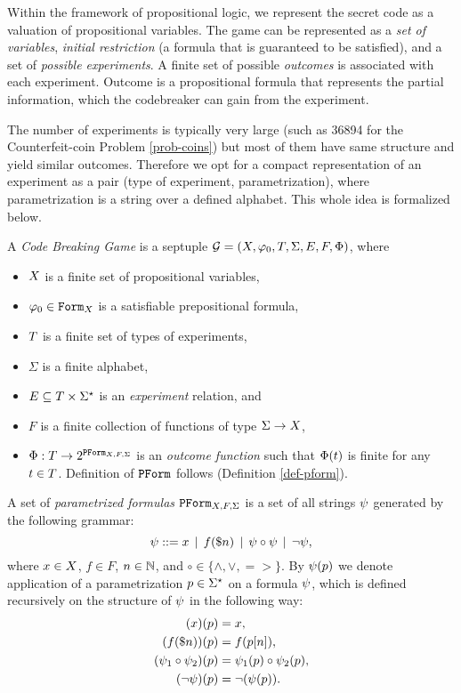Within the framework of propositional logic,
  we represent the secret code as a valuation
  of propositional variables.
The game can be represented as a \emph{set of variables},
  \emph{initial restriction} (a formula that is guaranteed to be satisfied),
  and a set of \emph{possible experiments}.
A finite set of possible \emph{outcomes} is associated with each experiment.
Outcome is a propositional formula that represents the partial information,
  which the codebreaker can gain from the experiment.

The number of experiments is typically very large
  (such as 36894 for the Counterfeit-coin Problem \ref{prob-coins})
  but most of them have same structure and yield similar outcomes.
Therefore we opt for a compact representation of an experiment as a pair
  (type of experiment, parametrization), where parametrization is a string
  over a defined alphabet.
This whole idea is formalized below.

\begin{definition} \label{def-game}
A \emph{Code Breaking Game} is a septuple
  $\mathcal{G} = (X, \varphi_0, T, \Sigma, E, F, \Phi)$, where
  \begin{itemize}
  \item $X$ is a finite set of propositional variables,
  \item $\varphi_0 \in \mathtt{Form}_X$ is a satisfiable prepositional formula,
  \item $T$ is a finite set of types of experiments,
  \item $\Sigma$ is a finite alphabet,
  \item $E \subseteq T \times \Sigma^\star$ is an \emph{experiment} relation,
  and
  \item $F$ is a finite collection of functions of type $\Sigma -> X$,
  \item $\Phi: T -> 2^{\mathtt{PForm}_{X,F,\Sigma}}$ is an
  \emph{outcome function} such that $\Phi(t)$ is finite
  for any $t\in T$. Definition of $\mathtt{PForm}$ follows (Definition \ref{def-pform}).
  \end{itemize}
\end{definition}

\begin{definition} \label{def-pform}
A set of \emph{parametrized formulas} $\mathtt{PForm}_{X,F,\Sigma}$ is a set of
 all strings $\psi$ generated by the following grammar:
$$ \psi ::= x \:\:|\:\: f(\$n) \:\:|\:\: \psi \circ \psi \:\:|\:\: \neg \psi,$$
where $x\in X$, $f\in F$, $n \in\mathbb{N}$, and $\circ\in\{\wedge, \vee, =>\}$.
By $\psi(p)$ we denote application of a parametrization $p\in\Sigma^\star$
on a formula $\psi$, which is defined recursively on the structure of $\psi$ in the following way:
\begin{align}
(x)(p) &= x, \\
(f(\$n))(p) &= f(p[n]),\\
(\psi_1\circ\psi_2)(p) &= \psi_1(p) \circ \psi_2(p),\\
(\neg\psi)(p) &= \neg(\psi(p)).
\end{align}
\end{definition}

